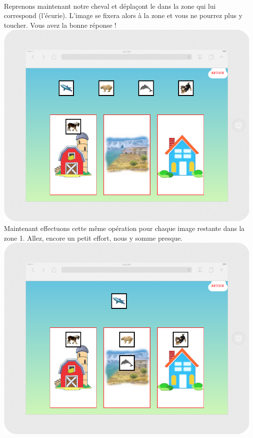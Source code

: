 \documentclass{article}
\begin{document}
\vspace{0.5cm}\\
Reprenons maintenant notre cheval et dépla\c{c}ont le dans la zone qui lui correspond (l'écurie). L'image se fixera alors à la zone et vous ne pourrez plus y toucher. Vous avez la bonne réponse !
\vspace{0.5cm}\\
\includegraphics[width=1.0\textwidth]{zone4}
\vspace{0.5cm}\\
Maintenant effectuons cette même opération pour chaque image restante dans la zone 1. Allez, encore un petit effort, nous y somme presque.
\vspace{0.5cm}\\
\includegraphics[width=1.0\textwidth]{zone5}
\end{document}
